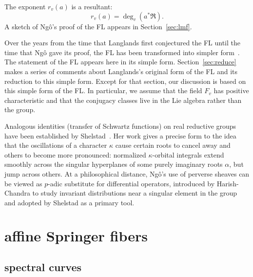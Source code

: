 \documentclass[brochure,english,12pt]{bourbaki}
\theoremstyle{plain}
\def\RDIV{{\mathfrak{R}}}
\begin{document}
The exponent $r_v(a)$ is a resultant:
\[
r_v(a) = \deg_v(a^*\RDIV).
\]
A sketch of Ng\^o's proof of the FL  appears in Section~\ref{sec:lmf}. 


Over the years from the time that Langlands first conjectured the FL
until the time that Ng\^o gave its proof, the FL has been transformed
into simpler form~\cite{Langlands:debuts}.  The statement of the FL
appears here in its simple form.  Section~\ref{sec:reduce} makes a
series of comments about Langlands's original form of the FL and its
reduction to this simple form.  Except for that section, our
discussion is based on this simple form of the FL.  In particular, we
assume that the field $F_v$ has positive characteristic and that the
conjugacy classes live in the Lie algebra rather than the group.

Analogous identities (transfer of Schwartz functions)
on real reductive groups have been established by 
Shelstad~\cite{Shelstad:OI}.  Her work gives a precise form to the
 idea that the oscillations of a character
$\kappa$ cause certain roots to cancel away and others to become more
pronounced: normalized $\kappa$-orbital integrals extend smoothly
across the singular hyperplanes of some purely imaginary roots $\alpha$,
but jump across others.  At a philosophical distance, Ng\^o's use of
perverse sheaves can be viewed as $p$-adic substitute for 
differential operators, introduced by Harish-Chandra to study
invariant distributions near a singular element in the group and
adopted by Shelstad as a primary tool.



\section{affine Springer fibers}

\subsection{spectral curves}
\end{document}
